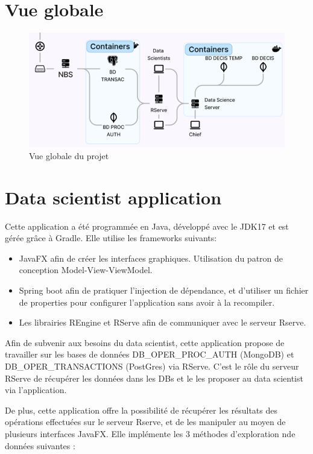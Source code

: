 \section{Vue globale}

\begin{figure}[H]
    \centering
    \includegraphics[width=\textwidth]{./img/thibault-VueGlobale.png}
    \caption{Vue globale du projet}
    \label{fig:thibault-global-view}
\end{figure}

\section{Data scientist application}

Cette application a été programmée en Java, développé avec le JDK17 et est gérée grâce à Gradle. Elle
utilise les frameworks suivants:

\begin{itemize}
    \item JavaFX afin de créer les interfaces graphiques. Utilisation du patron de conception Model-View-ViewModel.
    \item Spring boot afin de pratiquer l'injection de dépendance, et d'utiliser un fichier de properties pour configurer l'application sans avoir à la recompiler.
    \item Les librairies REngine et RServe afin de communiquer avec le serveur Rserve.
\end{itemize}

Afin de subvenir aux besoins du data scientist, cette application propose de travailler sur les bases de
données DB\_OPER\_PROC\_AUTH (MongoDB) et DB\_OPER\_TRANSACTIONS (PostGres) via RServe. C'est
le rôle du serveur RServe de récupérer les données dans les DBs et le les proposer au data scientist via
l'application.

De plus, cette application offre la possibilité de récupérer les résultats des opérations effectuées sur le
serveur Rserve, et de les manipuler au moyen de plusieurs interfaces JavaFX. Elle implémente les 3
méthodes d'exploration nde données suivantes :


